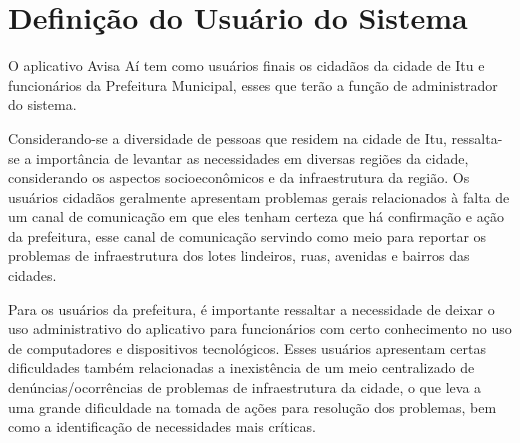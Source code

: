 \chapter{Definição do Usuário do Sistema}
O aplicativo Avisa Aí tem como usuários finais os cidadãos da cidade de Itu e funcionários da Prefeitura Municipal, esses que terão a função de administrador do sistema.

Considerando-se a diversidade de pessoas que residem na cidade de Itu, ressalta-se a importância de levantar as necessidades em diversas regiões da cidade, considerando os aspectos socioeconômicos e da infraestrutura da região. Os usuários cidadãos geralmente apresentam problemas gerais relacionados à falta de um canal de comunicação em que eles tenham certeza que há confirmação e ação da prefeitura, esse canal de comunicação servindo como meio para reportar os problemas de infraestrutura dos lotes lindeiros, ruas, avenidas e bairros das cidades.

Para os usuários da prefeitura, é importante ressaltar a necessidade de deixar o uso administrativo do aplicativo para funcionários com certo conhecimento no uso de computadores e dispositivos tecnológicos.  Esses usuários apresentam certas dificuldades também relacionadas a inexistência de um meio centralizado de denúncias/ocorrências de problemas de infraestrutura da cidade, o que leva a uma grande dificuldade na tomada de ações para resolução dos problemas, bem como a identificação de necessidades mais críticas.

